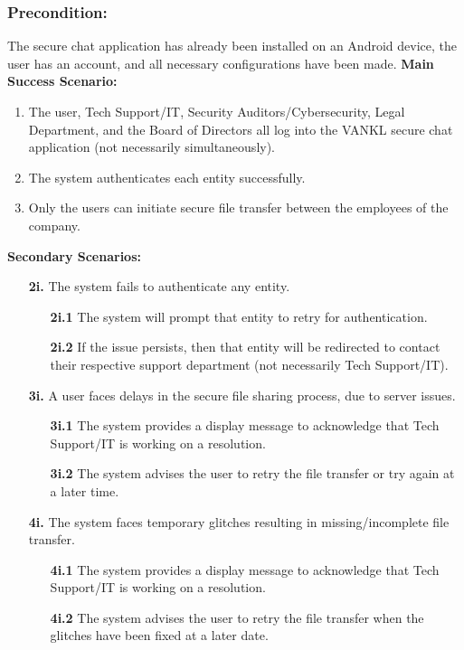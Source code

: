 \documentclass[]{article}
\begin{document}
\subsubsection*{Precondition:} The secure chat application has already been installed on an Android device, the user has an account, and all necessary configurations have been made.\newline\newline
\textbf{Main Success Scenario:}
\begin{enumerate}
	\item The user, Tech Support/IT, Security Auditors/Cybersecurity, Legal Department, and the Board of Directors all log into the VANKL secure chat application (not necessarily simultaneously).
	\item The system authenticates each entity successfully.
	\item Only the users can initiate secure file transfer between the employees of the company.
\end{enumerate}
\textbf{Secondary Scenarios:}
\begin{enumerate}
	\item[\textbf{2i.}] The system fails to authenticate any entity.
		\begin{enumerate}
			\item[\textbf{2i.1}] The system will prompt that entity to retry for authentication.
			\item[\textbf{2i.2}] If the issue persists, then that entity will be redirected to contact their respective support department (not necessarily Tech Support/IT).
		\end{enumerate}
	\item[\textbf{3i.}] A user faces delays in the secure file sharing process, due to server issues.
		\begin{enumerate}
			\item[\textbf{3i.1}] The system provides a display message to acknowledge that Tech Support/IT is working on a resolution.
			\item[\textbf{3i.2}] The system advises the user to retry the file transfer or try again at a later time.
		\end{enumerate}
	\item[\textbf{4i.}] The system faces temporary glitches resulting in missing/incomplete file transfer.
		\begin{enumerate}
			\item[\textbf{4i.1}] The system provides a display message to acknowledge that Tech Support/IT is working on a resolution.
			\item[\textbf{4i.2}] The system advises the user to retry the file transfer when the glitches have been fixed at a later date.
		\end{enumerate}
\end{enumerate}
\end{document}
